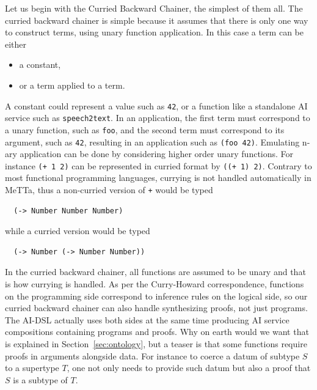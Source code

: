 \documentclass[]{report}
\begin{document}
Let us begin with the Curried Backward Chainer, the simplest of them
all.  The curried backward chainer is simple because it assumes that
there is only one way to construct terms, using unary function
application.  In this case a term can be either
\begin{itemize}
\item a constant,
\item or a term applied to a term.
\end{itemize}
A constant could represent a value such as \texttt{42}, or
a function like a standalone AI service such as
\texttt{speech2text}.  In an application, the first term
must correspond to a unary function, such as \texttt{foo},
and the second term must correspond to its argument, such as
\texttt{42}, resulting in an application such as
\texttt{(foo 42)}.  Emulating n-ary application can be
done by considering higher order unary functions.  For instance
\texttt{(+ 1 2)} can be represented in curried format by
\texttt{((+ 1) 2)}.  Contrary to most functional
programming languages, currying is not handled automatically in MeTTa,
thus a non-curried version of \texttt{+} would be typed
\begin{verbatim}
  (-> Number Number Number)
\end{verbatim}
while a curried version would be typed
\begin{verbatim}
  (-> Number (-> Number Number))
\end{verbatim}
In the curried backward chainer, all functions are assumed to be unary
and that is how currying is handled.  As per the Curry-Howard
correspondence, functions on the programming side correspond to
inference rules on the logical side, so our curried backward chainer
can also handle synthesizing proofs, not just programs.  The AI-DSL
actually uses both sides at the same time producing AI service
compositions containing programs and proofs.  Why on earth would we
want that is explained in Section~\ref{sec:ontology}, but a teaser is
that some functions require proofs in arguments alongside data.  For
instance to coerce a datum of subtype $S$ to a supertype $T$, one not
only needs to provide such datum but also a proof that $S$ is a
subtype of $T$.
\end{document}
